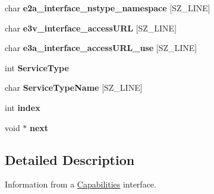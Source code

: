 \begin{CompactItemize}
\item 
\hypertarget{structCapabilities_c37517f8318d91e4d9339336f777970e}{
char \textbf{e2a\_\-interface\_\-nstype\_\-namespace} \mbox{[}SZ\_\-LINE\mbox{]}}
\label{structCapabilities_c37517f8318d91e4d9339336f777970e}

\item 
\hypertarget{structCapabilities_f668fcc3d42afce3d5cb1a90db6258d2}{
char \textbf{e3v\_\-interface\_\-accessURL} \mbox{[}SZ\_\-LINE\mbox{]}}
\label{structCapabilities_f668fcc3d42afce3d5cb1a90db6258d2}

\item 
\hypertarget{structCapabilities_1c5eeaea0c9957c60b6a59ccba3b2f62}{
char \textbf{e3a\_\-interface\_\-accessURL\_\-use} \mbox{[}SZ\_\-LINE\mbox{]}}
\label{structCapabilities_1c5eeaea0c9957c60b6a59ccba3b2f62}

\item 
\hypertarget{structCapabilities_e0e325e393da6cb2ac3b6f2961889e4f}{
int \textbf{ServiceType}}
\label{structCapabilities_e0e325e393da6cb2ac3b6f2961889e4f}

\item 
\hypertarget{structCapabilities_d05c975eb7ea18a96fbbfbbcf659c2b9}{
char \textbf{ServiceTypeName} \mbox{[}SZ\_\-LINE\mbox{]}}
\label{structCapabilities_d05c975eb7ea18a96fbbfbbcf659c2b9}

\item 
\hypertarget{structCapabilities_9aa68c3a355699c292807e5d4bdf34dd}{
int \textbf{index}}
\label{structCapabilities_9aa68c3a355699c292807e5d4bdf34dd}

\item 
\hypertarget{structCapabilities_df944c69e784fdf6643a6abc23a74bab}{
void $\ast$ \textbf{next}}
\label{structCapabilities_df944c69e784fdf6643a6abc23a74bab}

\end{CompactItemize}


\subsection{Detailed Description}
Information from a \hyperlink{structCapabilities}{Capabilities} interface. 

